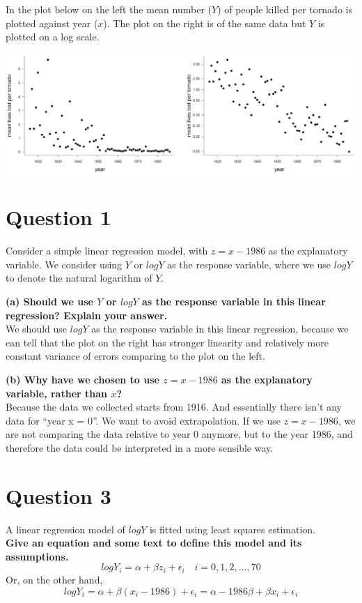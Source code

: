 \documentclass[
]{book}
\begin{document}
In the plot below on the left the mean number (\(Y\)) of people killed per tornado is plotted against year (\(x\)). The plot on the right is of the same data but \(Y\) is plotted on a log scale.

\includegraphics{tornado.png}

\section{Question 1}\label{question-1-5}

Consider a simple linear regression model, with \(z = x - 1986\) as the explanatory variable. We consider using \(Y\) or \(log Y\) as the response variable, where we use \(log Y\) to denote the natural logarithm of \(Y\).

\textbf{(a) Should we use \(Y\) or \(log Y\) as the response variable in this linear regression? Explain your answer.}\\
We should use \(log Y\) as the response variable in this linear regression, because we can tell that the plot on the right has stronger linearity and relatively more constant variance of errors comparing to the plot on the left.

\textbf{(b) Why have we chosen to use \(z = x - 1986\) as the explanatory variable, rather than \(x\)?}\\
Because the data we collected starts from 1916. And essentially there isn't any data for ``year x = 0''. We want to avoid extrapolation. If we use \(z = x - 1986\), we are not comparing the data relative to year 0 anymore, but to the year 1986, and therefore the data could be interpreted in a more sensible way.

\section{Question 3}\label{question-3-4}

A linear regression model of \(log Y\) is fitted using least squares estimation.\\
\textbf{Give an equation and some text to define this model and its assumptions.}\\
\[log Y_i =  \alpha + \beta z_i + \epsilon_i \quad i = 0, 1, 2, ..., 70\]
Or, on the other hand,
\[log Y_i = \alpha + \beta (x_i - 1986) + \epsilon_i = \alpha -1986\beta + \beta x_i + \epsilon_i\]
\end{document}
